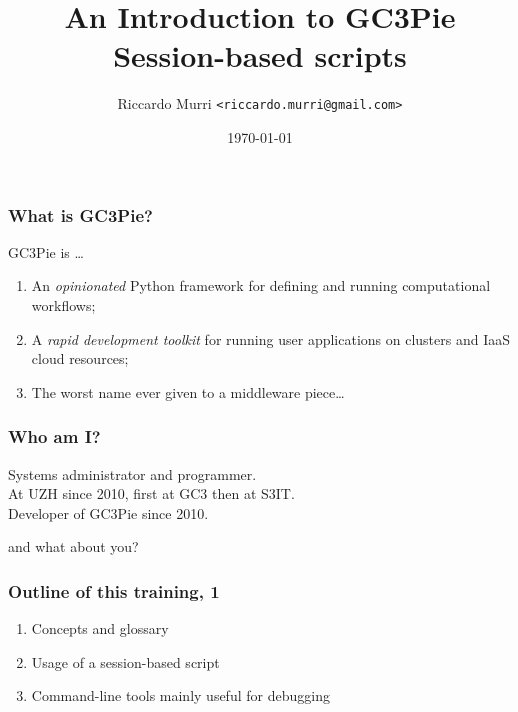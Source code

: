 \documentclass[english,serif,mathserif,usenames,dvipsnames]{beamer}
\begin{document}
\title[GC3Pie Tools]{An Introduction to GC3Pie Session-based scripts}
\author{Riccardo Murri \texttt{<riccardo.murri@gmail.com>}}
\date{\today}

\maketitle

%

\begin{frame}
  \frametitle{What is GC3Pie?}
  GC3Pie is \ldots
  \begin{enumerate}
  \item An \emph{opinionated} Python framework for defining and running computational workflows;
  \item \alert<2->{A \emph{rapid development toolkit} for running user applications on clusters and IaaS cloud resources;}
  \item The worst name ever given to a middleware piece\ldots
  \end{enumerate}

\end{frame}


\begin{frame}
  \frametitle{Who am I?}
  \begin{center}
    Systems administrator and programmer.
    \\ \+
    At UZH since 2010, first at GC3 then at S3IT.
    \\ \+
    Developer of GC3Pie since 2010.
  \end{center}
\end{frame}


\begin{frame}
  \begin{center}
    {\Huge and what about you?}
  \end{center}
\end{frame}


\begin{frame}
  \frametitle{Outline of this training, 1}
  \begin{enumerate}
  \item Concepts and glossary
  \item Usage of a session-based script
  \item Command-line tools mainly useful for debugging
  \end{enumerate}
\end{frame}
\end{document}
